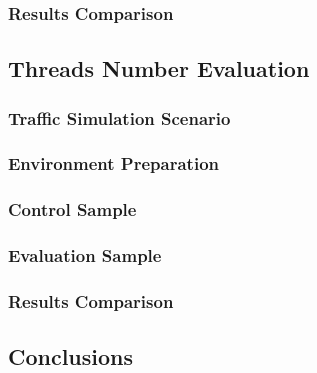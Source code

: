 \documentclass[10pt,a4paper]{article}
\begin{document}
\subsubsection{Results Comparison} 

\subsection{Threads Number Evaluation}
\subsubsection{Traffic Simulation Scenario} 
\subsubsection{Environment Preparation} 
\subsubsection{Control Sample} 
\subsubsection{Evaluation Sample} 
\subsubsection{Results Comparison} 

\subsection{Conclusions} 

\pagebreak
\clearpage
\end{document}
